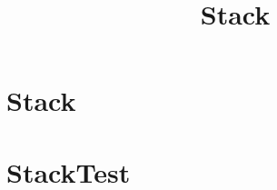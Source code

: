 \documentclass{article}
\begin{document}
\title{Stack}
\author{}
\maketitle
\tableofcontents

\section{Stack}

\section{StackTest}

\end{document}
